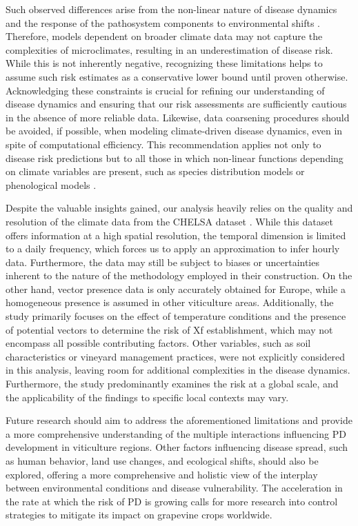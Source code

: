 Such observed differences arise from the non-linear nature of disease
dynamics and the response of the pathosystem components to environmental shifts
\cite{Scherm1994,Dudney2021}. Therefore, models dependent on broader
climate data may not capture the complexities of microclimates, resulting in an
underestimation of disease risk.  While this is not inherently negative,
recognizing these limitations helps to assume such risk estimates as a
conservative lower bound until proven otherwise. Acknowledging these
constraints is crucial for refining our understanding of disease dynamics and
ensuring that our risk assessments are sufficiently cautious in the absence of
more reliable data. Likewise, data coarsening procedures should be avoided, if
possible, when modeling climate-driven disease dynamics, even in spite of
computational efficiency. This recommendation applies not only to disease risk
predictions but to all those in which non-linear functions depending on climate
variables are present, such as species distribution models or phenological
models \cite{menzel2006european}.

Despite the valuable insights gained,  our analysis heavily relies on the
quality and resolution of the climate data from the CHELSA dataset
\cite{chelsa-climatologies-2021}. While this dataset offers information at a
high spatial resolution, the temporal dimension is limited to a daily
frequency, which forces us to apply an approximation to infer hourly data.
Furthermore, the data may still be subject to biases or uncertainties inherent
to the nature of the methodology employed in their construction. On the other
hand, vector presence data is only accurately obtained for Europe, while a
homogeneous presence is assumed in other viticulture areas. Additionally, the
study primarily focuses on the effect of temperature conditions and the
presence of potential vectors to determine the risk of Xf establishment, which
may not encompass all possible contributing factors. Other variables, such as
soil characteristics or vineyard management practices, were not explicitly
considered in this analysis, leaving room for additional complexities in the
disease dynamics. Furthermore, the study predominantly examines the risk at a
global scale, and the applicability of the findings to specific local contexts
may vary.

Future research should aim to address the aforementioned limitations and
provide a more comprehensive understanding of the multiple interactions
influencing PD development in viticulture regions. Other factors influencing
disease spread, such as human behavior, land use changes, and ecological
shifts, should also be explored, offering a more comprehensive and holistic
view of the interplay between environmental conditions and disease
vulnerability. The acceleration in the rate at which the risk of PD is growing
calls for more research into control strategies to mitigate its impact on
grapevine crops worldwide.

